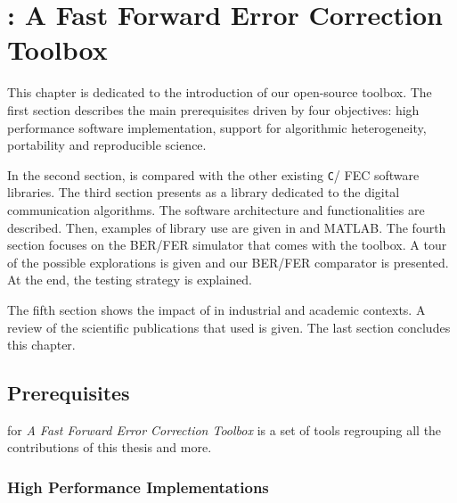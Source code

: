 
\renewcommand{\curChapter}{main/chapter3}

\chapter{\AFFECT: A Fast Forward Error Correction Toolbox}
\label{chap:aff3ct}

This chapter is dedicated to the introduction of our \AFFECT open-source
toolbox. The first section describes the main prerequisites driven by four
objectives: high performance software implementation, support for algorithmic
heterogeneity, portability and reproducible science.

In the second section, \AFFECT is compared with the other existing \verb|C|/\Cxx
FEC software libraries. The third section presents \AFFECT as a library
dedicated to the digital communication algorithms. The software architecture and
functionalities are described. Then, examples of library use are given in \Cxx
and MATLAB. The fourth section focuses on the \AFFECT BER/FER simulator that
comes with the toolbox. A tour of the possible explorations is given and our
BER/FER comparator is presented. At the end, the \AFFECT testing strategy is
explained.

The fifth section shows the impact of \AFFECT in industrial and academic
contexts. A review of the scientific publications that used \AFFECT is given.
The last section concludes this chapter.

\vspace*{\fill}
\minitoccustom
\vspace*{\fill}

\newpage
\section{Prerequisites}

\AFFECT for \emph{A Fast Forward Error Correction Toolbox} is a set of tools
regrouping all the contributions of this thesis and more.

\subsection{High Performance Implementations}

